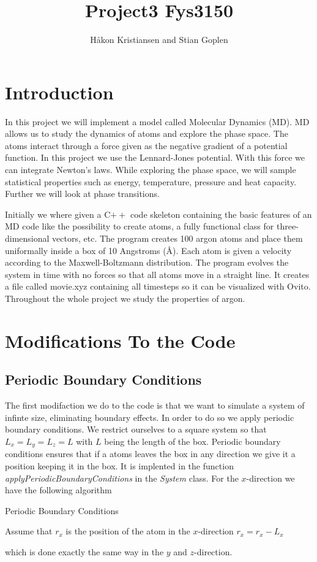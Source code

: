 \documentclass[a4paper,10pt]{article}
\title{Project3 Fys3150}
\author{Håkon Kristiansen and Stian Goplen}
\begin{document}
\maketitle

\begin{abstract}

\end{abstract}

\section{Introduction}
In this project we will implement a model called Molecular Dynamics (MD). MD allows us to study the dynamics of atoms
and explore the phase space. The atoms interact through a force given as the negative gradient of a potential function. In this
project we use the Lennard-Jones potential. With this force we can integrate Newton's laws. While exploring the phase space, we will
sample statistical properties such as energy, temperature, pressure and heat capacity. Further we will look at phase transitions.

Initially we where given a C$++$ code skeleton containing the basic features of an MD code like the possibility to create atoms, a fully 
functional class for three-dimensional vectors, etc.
The program creates 100 argon atoms and place them uniformally inside a box of 10 Angstroms (Å). Each atom is given a velocity according
to the Maxwell-Boltzmann distribution. The program evolves the system in time with no forces so that all atoms move in a straight line. It creates
a file called movie.xyz containing all timesteps so it can be visualized with Ovito. Throughout the whole project we study the 
properties of argon. 

\section{Modifications To the Code}
\subsection{Periodic Boundary Conditions}
The first modifaction we do to the code is that we want to simulate a system of infinte size, eliminating boundary effects. In order to do so
we apply periodic boundary conditions. We restrict ourselves to a square system so that $L_x = L_y = L_z = L$ with $L$ being the
length of the box. Periodic boundary conditions ensures that if a atoms leaves the box in any direction we give it a position keeping it
in the box. It is implented in the function \textit{applyPeriodicBoundaryConditions} in the \textit{System} class. For the $x$-direction we have the following
algorithm
\begin{algorithm}[H]
  \caption{Periodic Boundary Conditions}
  \SetAlgoLined
  Assume that $r_x$ is the position of the atom in the $x$-direction\; \label{first_step}
  {
     $r_x = r_x - L_x$
   }
\end{algorithm}

\vspace{3mm}

\noindent which is done exactly the same way in the $y$ and $z$-direction.
\end{document}
